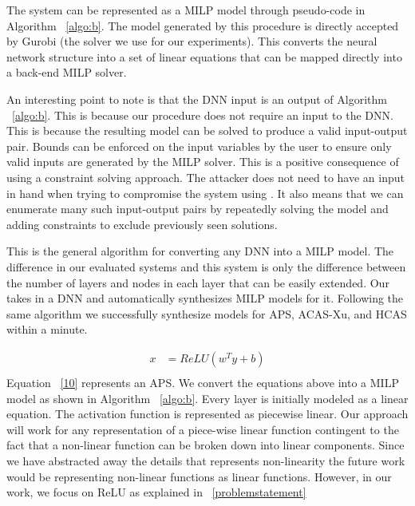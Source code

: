 The system can be represented as a MILP model through pseudo-code in Algorithm ~\ref{algo:b}. 
The model generated by this procedure is directly accepted by Gurobi (the solver we use for our experiments).
This converts the neural network structure into a set of linear equations that can be mapped directly into a back-end MILP solver.

An interesting point to note is that the DNN input is an output of Algorithm  ~\ref{algo:b}. 
This is because our procedure does not require an input to the DNN. 
This is because the resulting model can be solved to produce a valid input-output pair.
 Bounds can be enforced on the input variables by the user to ensure only
valid inputs are generated by the MILP solver. 
This is a positive consequence of using a constraint solving approach.
 The attacker does not need to have an input in hand when trying to compromise the system using \tool. 
 It also means that we can enumerate many such input-output pairs by repeatedly solving the model
and adding constraints to exclude previously seen solutions.

This is the general algorithm for converting any \ac{DNN} into a \ac{MILP} model. 
The difference in our evaluated systems and this system is only the difference between the number of layers and nodes in each layer that can be easily extended.
Our \tool  takes in a \ac{DNN} and automatically synthesizes \ac{MILP} models for it. 
Following the same algorithm we successfully synthesize models for \ac{APS}, \ac{ACAS-Xu}, and \ac{HCAS} within a minute. 

\begin{equation}
\label{10}
\begin{aligned}
x &= ReLU(w^Ty + b) \\
\end{aligned}
\end{equation}
Equation ~\ref{10} represents an \ac{APS}. 
We convert the equations above into a MILP model as shown in Algorithm ~\ref{algo:b}. 
Every layer is initially modeled as a linear equation. 
The activation function is represented as piecewise linear.
Our approach will work for any representation of a piece-wise linear function contingent to the fact that a non-linear function can be broken down into linear components.
Since we have abstracted away the details that represents non-linearity the future work would be representing non-linear functions as linear functions. 
 However, in our work, we focus on ReLU as explained in ~\ref{problemstatement}

